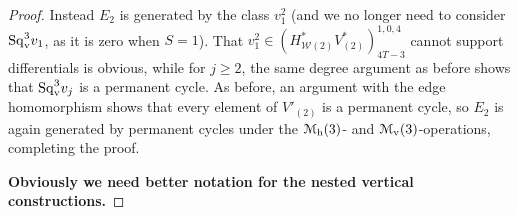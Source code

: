 \documentclass[11pt]{amsart}
\theoremstyle{plain}
\theoremstyle{definition}
\newcommand{\calW}{\mathcal{W}}
\newcommand{\calM}{\mathcal{M}}
\newcommand{\calmv}{\mathcal{M}_\textup{v}}
\newcommand{\calmh}{\mathcal{M}_\textup{h}}
\theoremstyle{plain}
\newcommand{\Sqv}{\mathrm{Sq}_\textup{v}}
\newcommand{\F}{\mathbb{F}}
\begin{document}
\begin{Calculations of HWn for n nonzero}
\begin{proof}
Instead $E_2$ is generated by the class $v_1^{2}$  (and we no longer need to consider $\Sqv^{3}v_1$, as it is zero when $S=1$). That $v_1^2\in(H^*_{\calW(2)}V_{(2)}^*)^{1,0,4}_{4T-3}$ cannot support differentials is obvious, while for $j\geq2$, the same degree argument as before shows that $\Sqv^3v_j$ is a permanent cycle. As before, an argument with the edge homomorphism shows that every element of $V'_{(2)}$ is a permanent cycle, so $E_2$ is again generated by permanent cycles under the $\calmh(3)$- and $\calmv(3)$-operations, completing the proof.

 \textbf{Obviously we need better notation for the nested vertical constructions.}
\end{proof}






\end{Calculations of HWn for n nonzero}
\end{document}
